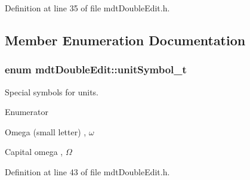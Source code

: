 Definition at line 35 of file mdt\-Double\-Edit.\-h.



\subsection{Member Enumeration Documentation}
\hypertarget{classmdt_double_edit_a6e94cba2a7b3fcc16b70475c2cefd8cf}{
\subsubsection[{unit\-Symbol\-\_\-t}]{\setlength{\rightskip}{0pt plus 5cm}enum {\bf mdt\-Double\-Edit\-::unit\-Symbol\-\_\-t}}}\label{classmdt_double_edit_a6e94cba2a7b3fcc16b70475c2cefd8cf}


Special symbols for units. 

\begin{Desc}
\item[Enumerator]\par
\begin{description}
\item[{\em 
\hypertarget{classmdt_double_edit_a6e94cba2a7b3fcc16b70475c2cefd8cfaaeecc523af2a2eba97a3b1a38f4518c5}{omega}\label{classmdt_double_edit_a6e94cba2a7b3fcc16b70475c2cefd8cfaaeecc523af2a2eba97a3b1a38f4518c5}
}]Omega (small letter) , {$\omega$} \item[{\em 
\hypertarget{classmdt_double_edit_a6e94cba2a7b3fcc16b70475c2cefd8cfadad86fae09055324dd22fc15e6107fe0}{Omega\-Capital}\label{classmdt_double_edit_a6e94cba2a7b3fcc16b70475c2cefd8cfadad86fae09055324dd22fc15e6107fe0}
}]Capital omega , {$\Omega$} \end{description}
\end{Desc}


Definition at line 43 of file mdt\-Double\-Edit.\-h.



